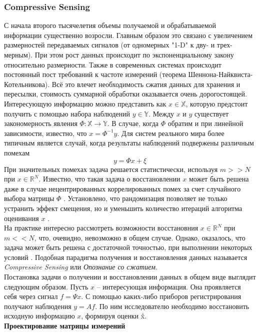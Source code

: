 \documentclass[14pt]{matmex-diploma}
\begin{document}
\subsubsection{Compressive Sensing} \label{sec:cs_description}
С начала второго тысячелетия объемы получаемой и обрабатываемой информации существенно возросли. Главным образом это связано с увеличением размерностей передаваемых сигналов (от одномерных "1-D" к дву- и  трех- мерным). При этом рост данных происходит по экспоненциальному закону относительно размерности. Также в современных системах происходит постоянный пост требований к частоте измерений (теорема Шеннона-Найквиста-Котельникова). Всё это влечет необходимость сжатия данных для хранения и пересылки, стоимость суммарной обработки оказывается очень дорогостоящей.
Интересующую информацию можно представить как $x \in \mathbb{X}$, которую предстоит получить с помощью набора наблюдений $y \in \mathbb{Y}$. Между $x$ и $y$ существует закономерность явления $\Phi:\mathbb{X}\to\mathbb{Y}$. В случае, когда $\Phi$ обратим и при линейной зависимости, известно, что $x = \Phi^{-1}y $. Для систем реального мира более типичным является случай, когда результаты наблюдений подвержены различным помехам \[y = \Phi x + \xi\] 
При значительных помехах задача решается статистически, используя $m >> N$ при $x \in \mathbb{R}^N$. Известно, что такая задача о восстановлении $x$ может быть решена даже в случае нецентрированных коррелированных помех за счет случайного выбора матрицы $\Phi$ \cite{granichin2004linear}. Установлено, что рандомизация позволяет не только устранить эффект смещения, но и уменьшить количество итераций алгоритма оценивания $x$ \cite{граничин2003рандомизированные}. \\
На практике интересно рассмотреть возможности восстановния $x \in \mathbb{R}^N$ при $m << N$, что, очевидно, невозможно в общем случае. Однако, оказалось, что задача может быть решена с достаточной точностью, при выполнении некоторых условий \cite{donoho2006compressed}. Подобная парадигма получения и восстановления данных называется \textit{Compressive Sensing} или \textit{Опознание со сжатием}. \\
Постановка задачи о получении и восстановлении данных в общем виде выглядит следующим образом. Пусть $x$ -- интересующая информация. Она проявляется себя через сигнал $f = \Psi x$. С помощью каких-либо приборов регистрирования получают наблюдения $y = A f$. По ним исследователю необходимо восстановить исходную информацию $x$, формируя оценки \^{x}. \\
\textbf{Проектирование матрицы измерений}\\
\end{document}
